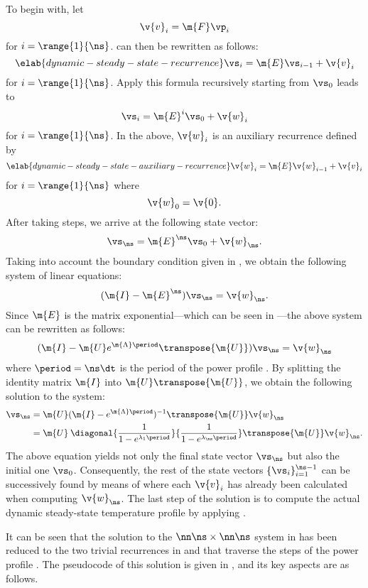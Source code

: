 To begin with, let
\[
  \v{v}_i = \m{F} \vp_i
\]
for $i = \range{1}{\ns}$.  can then be rewritten as
follows:
\begin{equation} \elab{dynamic-steady-state-recurrence}
  \vs_i = \m{E} \vs_{i - 1} + \v{v}_i
\end{equation}
for $i = \range{1}{\ns}$. Apply this formula recursively starting from $\vs_0$
leads to
\[
  \vs_i = \m{E}^i \vs_0 + \v{w}_i
\]
for $i = \range{1}{\ns}$. In the above, $\v{w}_i$ is an auxiliary recurrence
defined by
\begin{equation} \elab{dynamic-steady-state-auxiliary-recurrence}
  \v{w}_i = \m{E} \v{w}_{i - 1} + \v{v}_i
\end{equation}
for $i = \range{1}{\ns}$ where
\[
  \v{w}_0 = \v{0}.
\]
After taking \ns steps, we arrive at the following state vector:
\[
  \vs_\ns = \m{E}^\ns \vs_0 + \v{w}_\ns.
\]
Taking into account the boundary condition given in
, we obtain the following system of linear
equations:
\[
  (\m{I} - \m{E}^\ns) \vs_\ns = \v{w}_\ns.
\]
Since $\m{E}$ is the matrix exponential---which can be seen in
---the above system can be rewritten as follows:
\[
  (\m{I} - \m{U} e^{\m{\Lambda} \period} \transpose{\m{U}}) \vs_\ns = \v{w}_\ns
\]
where $\period = \ns \dt$ is the period of the power profile \mp. By splitting
the identity matrix $\m{I}$ into $\m{U} \transpose{\m{U}}$, we obtain the
following solution to the system:
\begin{align*}
  \vs_\ns
  & = \m{U} (\m{I} - e^{\m{\Lambda} \period})^{-1} \transpose{\m{U}} \v{w}_\ns \\
  & = \m{U} \: \diagonal{\frac{1}{1 - e^{\lambda_1 \period}}}{\frac{1}{1 - e^{\lambda_\ns \period}}} \transpose{\m{U}} \v{w}_\ns.
\end{align*}
The above equation yields not only the final state vector $\vs_\ns$ but also the
initial one $\vs_0$. Consequently, the rest of the state vectors $\{ \vs_i \}_{i
= 1}^{\ns - 1}$ can be successively found by means of
 where each $\v{v}_i$ has already been
calculated when computing $\v{w}_\ns$. The last step of the solution is to
compute the actual dynamic steady-state temperature profile \mq by applying
.

It can be seen that the solution to the $\nn \ns \times \nn \ns$ system in
 has been reduced to the two trivial
recurrences in  and
 that traverse the \ns steps of
the power profile \mp. The pseudocode of this solution is given in
, and its key aspects are as follows.

